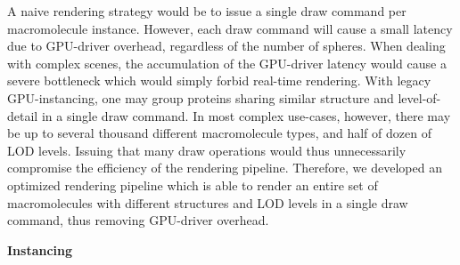 A naive rendering strategy would be to issue a single draw command per macromolecule instance.
However, each draw command will cause a small latency due to GPU-driver overhead, regardless of the number of spheres.
When dealing with complex scenes, the accumulation of the GPU-driver latency would cause a severe bottleneck which would simply forbid real-time rendering.
With legacy GPU-instancing, one may group proteins sharing similar structure and level-of-detail in a single draw command.
In most complex use-cases, however, there may be up to several thousand different macromolecule types, and half of dozen of LOD levels.
Issuing that many draw operations would thus unnecessarily compromise the efficiency of the rendering pipeline.
Therefore, we developed an optimized rendering pipeline which is able to render an entire set of macromolecules with different structures and LOD levels in a single draw command, thus removing GPU-driver overhead.

\textbf{Instancing}

